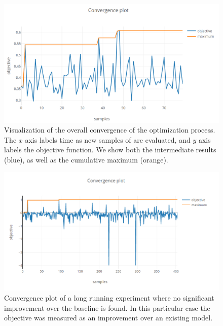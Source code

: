 \begin{figure}
	\begin{center}
		\includegraphics[width=1.0\textwidth]{images/convergence-plot.png}
		\caption{Visualization of the overall convergence of the optimization process. The $x$ axis labels time as new samples of are evaluated, and $y$ axis labels the objective function. We show both the intermediate results (blue), as well as the cumulative maximum (orange).}
	\end{center}
\end{figure}
\label{figure:convergence-plot}

\begin{figure}
	\begin{center}
		\includegraphics[width=1.0\textwidth]{images/convergence-plot-long-exp.png}
		\caption{Convergence plot of a long running experiment where no significant improvement over the baseline is found. In this particular case the objective was measured as an improvement over an existing model.}
	\end{center}
\end{figure}
\label{figure:convergence-plot-long-exp}


